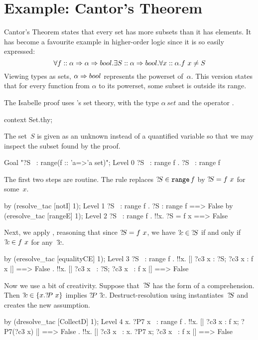 \goodbreak
\section{Example: Cantor's Theorem}\label{sec:hol-cantor}
Cantor's Theorem states that every set has more subsets than it has
elements.  It has become a favourite example in higher-order logic since
it is so easily expressed:
\[  \forall f::\alpha \Rightarrow \alpha \Rightarrow bool. \exists S::\alpha\Rightarrow bool.
    \forall x::\alpha. f~x \not= S 
\] 
%
Viewing types as sets, $\alpha\Rightarrow bool$ represents the powerset
of~$\alpha$.  This version states that for every function from $\alpha$ to
its powerset, some subset is outside its range.  

The Isabelle proof uses \HOL's set theory, with the type $\alpha\,set$ and
the operator .
\begin{ttbox}
context Set.thy;
\end{ttbox}
The set~$S$ is given as an unknown instead of a
quantified variable so that we may inspect the subset found by the proof.
\begin{ttbox}
Goal "?S ~: range\thinspace(f :: 'a=>'a set)";
{\out Level 0}
{\out ?S ~: range f}
{. ?S ~: range f}
\end{ttbox}
The first two steps are routine.  The rule  replaces
${?\!S}\in \texttt{range} \, f$ by ${?\!S}=f~x$ for some~$x$.
\begin{ttbox}
by (resolve_tac [notI] 1);
{\out Level 1}
{\out ?S ~: range f}
{. ?S : range f ==> False}
\ttbreak
by (eresolve_tac [rangeE] 1);
{\out Level 2}
{\out ?S ~: range f}
{. !!x. ?S = f x ==> False}
\end{ttbox}
Next, we apply , reasoning that since ${?\!S}=f~x$,
we have ${?\!c}\in {?\!S}$ if and only if ${?\!c}\in f~x$ for
any~${?\!c}$.
\begin{ttbox}
by (eresolve_tac [equalityCE] 1);
{\out Level 3}
{\out ?S ~: range f}
{. !!x. [| ?c3 x : ?S; ?c3 x : f x |] ==> False}
{. !!x. [| ?c3 x ~: ?S; ?c3 x ~: f x |] ==> False}
\end{ttbox}
Now we use a bit of creativity.  Suppose that~${?\!S}$ has the form of a
comprehension.  Then ${?\!c}\in\{x.{?\!P}~x\}$ implies
${?\!P}~{?\!c}$.   Destruct-resolution using 
instantiates~${?\!S}$ and creates the new assumption.
\begin{ttbox}
by (dresolve_tac [CollectD] 1);
{\out Level 4}
{\out {\ttlbrace}x. ?P7 x{\ttrbrace} ~: range f}
{. !!x. [| ?c3 x : f x; ?P7(?c3 x) |] ==> False}
{. !!x. [| ?c3 x ~: {\ttlbrace}x. ?P7 x{\ttrbrace}; ?c3 x ~: f x |] ==> False}
\end{ttbox}
